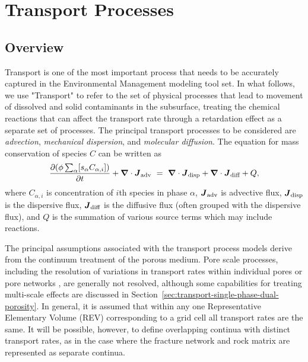 %
%
%

\section{Transport Processes}    
\label{sec:transport-processes}

\subsection{Overview}

Transport is one of the most important process that needs to be accurately 
captured in the Environmental Management modeling tool set.  
In what follows, we use "Transport" to refer to the set of physical processes 
that lead to movement of dissolved and solid contaminants in the subsurface, 
treating the chemical reactions that can affect the transport 
rate through a retardation effect as a separate set of processes.  
The principal transport processes to be considered are 
\emph{advection}, \emph{mechanical dispersion}, and \emph{molecular diffusion}.  
The equation for mass conservation of species $C$ can be written as
$$\label{eq:concervation of mass general}
  \frac{\partial ( \phi \sum_\alpha [s_{\alpha} C_{\alpha,i}] )}{\partial t } +
  {\boldsymbol{\nabla}} \cdot {\boldsymbol{J}}_{\text{adv}} \ =\  {\boldsymbol{\nabla}} \cdot {\boldsymbol{J}}_{\text{disp}} + {\boldsymbol{\nabla}} \cdot {\boldsymbol{J}}_{\text{diff}} + Q,
$$
where $C_{\alpha,i}$ is concentration of $i$th species in phase $\alpha$, 
${\boldsymbol{J}}_{\text{adv}}$ is advective flux, ${\boldsymbol{J}}_{\text{disp}}$ is the dispersive flux, 
${\boldsymbol{J}}_{\text{diff}}$ is the diffusive flux (often grouped with the dispersive flux), and  
$Q$ is the summation of various source terms which may include reactions.


The principal assumptions associated with the transport process models derive 
from the continuum treatment of the porous medium.  
Pore scale processes, including the resolution of variations in transport rates 
within individual pores or pore networks \citep{li2008scale,kang2006lattice,lichtner-kang-2007}, 
are generally not resolved, although some capabilities for treating multi-scale 
effects are discussed in Section~\ref{sec:transport-single-phase-dual-porosity}.  
In general, it is assumed that within any one Representative Elementary Volume (REV) 
corresponding to a grid cell all transport rates are the same.  
It will be possible, however, to define overlapping continua with distinct transport 
rates, as in the case where the fracture network and rock matrix are represented as separate continua.


